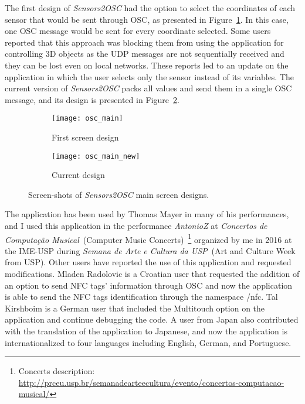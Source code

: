 The first design of \textit{Sensors2OSC} had the option to select the coordinates of each sensor that would be sent through OSC, as presented in Figure~\ref{fig:appsensors2oscfirstdesign}.
In this case, one OSC message would be sent for every coordinate selected.
Some users reported that this approach was blocking them from using the application for controlling 3D objects as the UDP messages are not sequentially received and they can be lost even on local networks.
These reports led to an update on the application in which the user selects only the sensor instead of its variables.
The current version of \textit{Sensors2OSC} packs all values and send them in a single OSC message, and its design is presented in Figure~\ref{fig:appsensors2oscseconddesign}.

\begin{figure*}[!ht]
\centering
\begin{subfigure}{.30\textwidth}
	\texttt{[image: osc\_main]}
    \caption{First screen design}
	\label{fig:appsensors2oscfirstdesign}
\end{subfigure}
\begin{subfigure}{.28\textwidth}
	\texttt{[image: osc\_main\_new]}
	\caption{Current design}
	\label{fig:appsensors2oscseconddesign}
\end{subfigure}

\caption{Screen-shots of \textit{Sensors2OSC} main screen designs.}
\label{fig:sensors2oscmainscreen}
\end{figure*}

The application has been used by Thomas Mayer in many of his performances, and I used this application in the performance \textit{AntonioZ} at \textit{Concertos de Computação Musical}~(Computer Music Concerts)~\footnote{Concerts description: \url{http://prceu.usp.br/semanadearteecultura/evento/concertos-computacao-musical/}} organized by me in 2016 at the IME-USP during \textit{Semana de Arte e Cultura da USP}~(Art and Culture Week from USP).
Other users have reported the use of this application and requested modifications.
Mladen Radolovic is a Croatian user that requested the addition of an option to send NFC tags' information through OSC and now the application is able to send the NFC tags identification through the namespace /nfc.
Tal Kirshboim is a German user that included the Multitouch option on the application and continue debugging the code. %
A user from Japan also contributed with the translation of the application to Japanese, and now the application is internationalized to four languages including English, German, and Portuguese.

